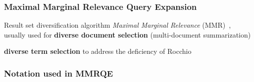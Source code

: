 \documentclass[xcolor=dvipsnames]{beamer}
\begin{document}
\begin{frame}
\frametitle{Maximal Marginal Relevance Query Expansion}

Result set diversification algorithm \emph{Maximal Marginal Relevance} (MMR)~\cite{Carbonell1998}, usually used for \textbf{diverse document selection} (multi-document summarization)

\textbf{diverse term selection}
to address the deficiency of Rocchio
\end{frame}


\begin{frame}
\frametitle{Notation used in MMRQE}

\begin{equation}
\end{equation}




\end{frame}
\end{document}
